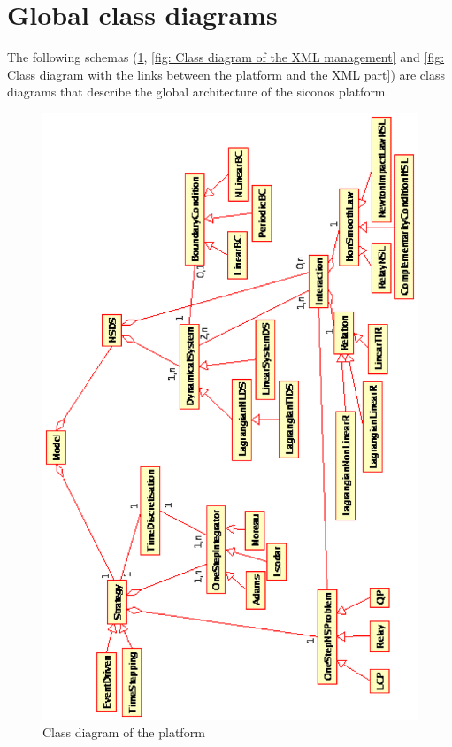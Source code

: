\section{Global class diagrams}
The following schemas (\ref{fig: Class diagram of the platform}, \ref{fig: Class diagram of the XML management} and \ref{fig: Class diagram with the links between the platform and the XML part})  are class diagrams that describe the global architecture of the \ac{siconos} platform.
	\begin{figure}
	\begin{center}
	\includegraphics[scale=1.2, clip]{figure/kernel2.eps}
	\caption{Class diagram of the platform}
	\label{fig: Class diagram of the platform}
	\end{center}
	\end{figure}
	
